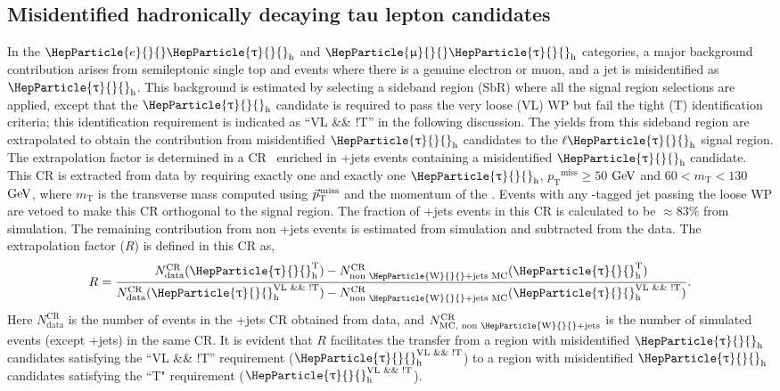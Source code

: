 \documentclass[11.5pt, a4paper]{article}
\newcommand{\pt}{\ensuremath{p_{\mathrm{T}}}\xspace}
\newcommand{\ptmiss}{\ensuremath{\pt^\text{miss}}}
\newcommand{\mT}{\ensuremath{m_{\mathrm{T}}}\xspace}
\newcommand{\ptvecmiss}{\ensuremath{{\vec p}_{\mathrm{T}}^{\kern1pt\text{miss}}}\xspace}
\newcommand{\GeV}{\ensuremath{\text{Ge\hspace{-.08em}V}}{}\xspace}
\DeclareRobustCommand{\PW}{{\HepParticle{W}{}{}}\xspace}
\DeclareRobustCommand{\PQb}{{\HepParticle{b}{}{}}\xspace} %
\DeclareRobustCommand{\PQt}{\HepParticle{t}{}{}} %
\DeclareRobustCommand{\PAQt}{{\HepAntiParticle{\PQt}{}{}}\xspace} %
\DeclareRobustCommand{\Pe}{{\HepParticle{e}{}{}}\xspace} %
\DeclareRobustCommand{\PGm}{{\HepParticle{\upmu}{}{}}\xspace} %
\DeclareRobustCommand{\PGt}{{\HepParticle{\uptau}{}{}}\xspace} %
\newcommand{\ttbar}{\PQt{}\PAQt} %
\newcommand{\tauh}{\ensuremath{\PGt_\mathrm{h}}\xspace}
\begin{document}
\subsection{Misidentified hadronically decaying tau lepton candidates}\label{fakeBkg_est}
In the $\Pe\tauh$ and $\PGm\tauh$ categories, a major background contribution arises from semileptonic single top and \ttbar events where there is a genuine electron or muon, and a jet is misidentified as $\tauh$.
This background is estimated by selecting a sideband region (SbR) where all the signal region selections are applied, except that the $\tauh$ candidate is required to pass the very loose (VL) WP but fail the tight (T) identification criteria; this identification requirement is indicated as ``VL \&\& !T'' in the following discussion.
The yields from this sideband region are extrapolated to obtain the contribution from misidentified \tauh candidates to the $\ell\tauh$ signal region.
The extrapolation factor is determined in a CR~\cite{CMS:2019eln} enriched in {\PW}+jets events containing a misidentified \tauh candidate.
This CR is extracted from data by requiring exactly one \PGm and exactly one $\tauh$, $\ptmiss\ge50$ \GeV and $60<\mT<130$ \GeV, where \mT is the transverse mass computed using \ptvecmiss and the momentum of the \PGm.
Events with any \PQb-tagged jet passing the loose WP are vetoed to make this CR orthogonal to the signal region.
The fraction of {\PW}+jets events in this CR is calculated to be $\approx83\%$ from simulation.
The remaining contribution from non {\PW}+jets events is estimated from simulation and subtracted from the data.
The extrapolation factor ($R$) is defined in this CR as,
	\begin{equation}
	R =
	\frac{N_\text{data}^\text{CR} (\tauh^{\text{T}}) - N_\text{non {\PW}+jets MC}^\text{CR} (\tauh^{\text{T}})}
	{N_\text{data}^\text{CR} (\tauh^{\text{VL \&\& !T}})-N_\text{non {\PW}+jets MC}^{\text{CR}}(\tauh^{\text{VL \&\& !T}})} .
	\label{eq:transferFactor}
	\end{equation}
Here $N_{\text{data}}^{\text{CR}}$ is the number of events in the {\PW}+jets CR obtained from data, and $N_\text{MC, non {\PW}+jets}^\text{CR}$ is the number of simulated events (except {\PW}+jets) in the same CR.
It is evident that $R$ facilitates the transfer from a region with misidentified \tauh candidates satisfying the ``VL \&\& !T'' requirement ($\tauh^{\text{VL \&\& !T}}$) to a region with misidentified \tauh candidates satisfying the ``T" requirement ($\tauh^{\text{VL \&\& !T}}$).
\end{document}
